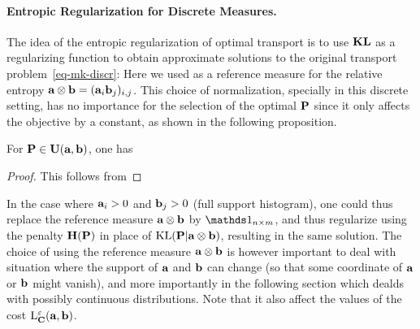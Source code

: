 \paragraph{Entropic Regularization for Discrete Measures.}

The idea of the entropic regularization of optimal transport is to use $\KLD$ as a regularizing function to obtain approximate solutions to the original transport problem~\eqref{eq-mk-discr}:
Here we used as a reference measure for the relative entropy $\a \otimes \b = (\a_i \b_j)_{i,j}$.
%
This choice of normalization, specially in this discrete setting, has no importance for the selection of the optimal $\P$ since it only affects the objective by a constant, as shown in the following proposition.

\begin{prop} For $\P \in \CouplingsD(\a,\b)$, one has
\end{prop}

\begin{proof}
This follows from 
\end{proof}

In the case where $\a_i>0$ and $\b_j>0$ (full support histogram), one could thus replace the reference measure $\a \otimes \b$ by $\ones_{n \times m}$, and thus regularize using the penalty $\HD(\P)$ in place of $\KL(\P|\a \otimes \b)$, resulting in the same solution.
%
The choice of using the reference measure $\a \otimes \b$ is however important to deal with situation where the support of $\a$ and $\b$ can change (so that some coordinate of $\a$ or $\b$ might vanish), and more importantly in the following section which dealds with possibly continuous distributions. Note that it also affect the values of the cost $\MKD_\C^\epsilon(\a,\b)$.




